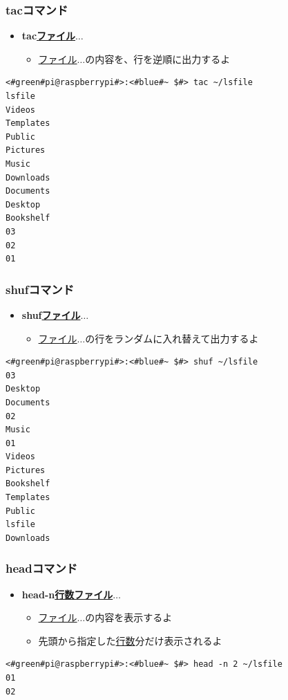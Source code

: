 \documentclass[slide03.tex]{subfiles}
\begin{document}
\begin{frame}[fragile]
    \frametitle{tacコマンド}
    \begin{itemize}
        \item {\bf tac\textvisiblespace\underline{ファイル}$\ldots$}
        \begin{itemize}
            \small
            \item[] \underline{ファイル}$\ldots$の内容を、行を逆順に出力するよ
        \end{itemize}
    \end{itemize}
    \begin{lstlisting}[title=tacコマンドの実行例, label=tac_example]
<#green#pi@raspberrypi#>:<#blue#~ $#> tac ~/lsfile
lsfile
Videos
Templates
Public
Pictures
Music
Downloads
Documents
Desktop
Bookshelf
03
02
01
    \end{lstlisting}
\end{frame}

\begin{frame}[fragile]
    \frametitle{shufコマンド}
    \begin{itemize}
        \item {\bf shuf\textvisiblespace\underline{ファイル}$\ldots$}
        \begin{itemize}
            \small
            \item \underline{ファイル}$\ldots$の行をランダムに入れ替えて出力するよ
        \end{itemize}
    \end{itemize}
    \begin{lstlisting}[title=shufコマンドの実行例, label=shuf_example]
<#green#pi@raspberrypi#>:<#blue#~ $#> shuf ~/lsfile
03
Desktop
Documents
02
Music
01
Videos
Pictures
Bookshelf
Templates
Public
lsfile
Downloads
    \end{lstlisting}
\end{frame}

\begin{frame}[fragile]
    \frametitle{headコマンド}
    \begin{itemize}
        \item {\bf head\textvisiblespace -n\textvisiblespace\underline{行数}\textvisiblespace\underline{ファイル}$\ldots$}
        \begin{itemize}
            \small
            \item[] \underline{ファイル}$\ldots$の内容を表示するよ
            \item[] 先頭から指定した\underline{行数}分だけ表示されるよ
        \end{itemize}
    \end{itemize}
    \begin{lstlisting}[title=headコマンドの実行例, label=head_example]
<#green#pi@raspberrypi#>:<#blue#~ $#> head -n 2 ~/lsfile
01
02
    \end{lstlisting}
\end{frame}
\end{document}
